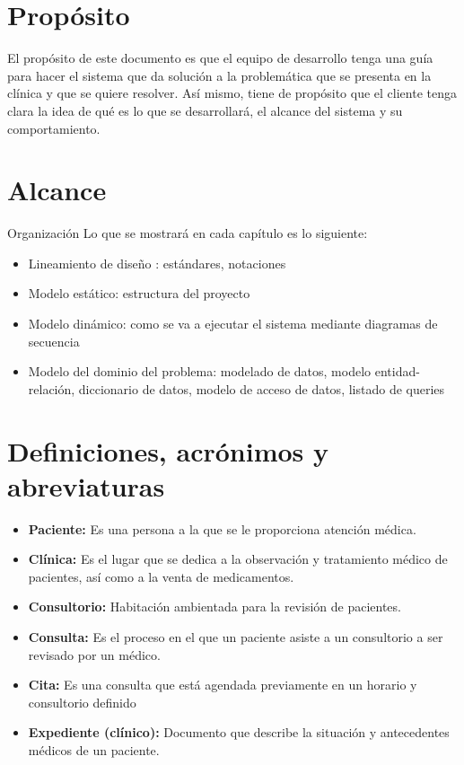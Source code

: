 \section{Propósito}
El propósito de este documento es que el equipo de desarrollo tenga una guía para hacer el sistema que da solución a la problemática que se presenta en la clínica y que se quiere resolver. Así mismo,  tiene de propósito que el cliente tenga clara la idea de qué es lo que se desarrollará, el alcance del sistema y su comportamiento.

\section{Alcance}

Organización
Lo que se mostrará en cada capítulo es lo siguiente:
\begin{itemize}
\item Lineamiento de diseño : estándares, notaciones

\item Modelo estático: estructura del proyecto

\item Modelo dinámico: como se va a ejecutar el sistema mediante diagramas de secuencia

\item Modelo del dominio del problema: modelado de datos, modelo entidad-relación, diccionario de datos, modelo de acceso de datos, listado de queries

\end{itemize}

\section{Definiciones, acrónimos y abreviaturas}

\begin{itemize}
\item \textbf{Paciente: }Es una persona a la que se le proporciona atención médica.
\item \textbf{Clínica: }Es el lugar que se dedica a la observación y tratamiento médico de pacientes, así como a la venta de medicamentos.
\item \textbf{Consultorio: }Habitación ambientada para la revisión de pacientes.
\item \textbf{Consulta: }Es el proceso en el que un paciente asiste a un consultorio a ser revisado por un médico.
\item \textbf{Cita: }Es una consulta que está agendada previamente en un horario y consultorio definido
\item \textbf{Expediente (clínico): }Documento que describe la situación y antecedentes médicos de un paciente.
\end{itemize}
